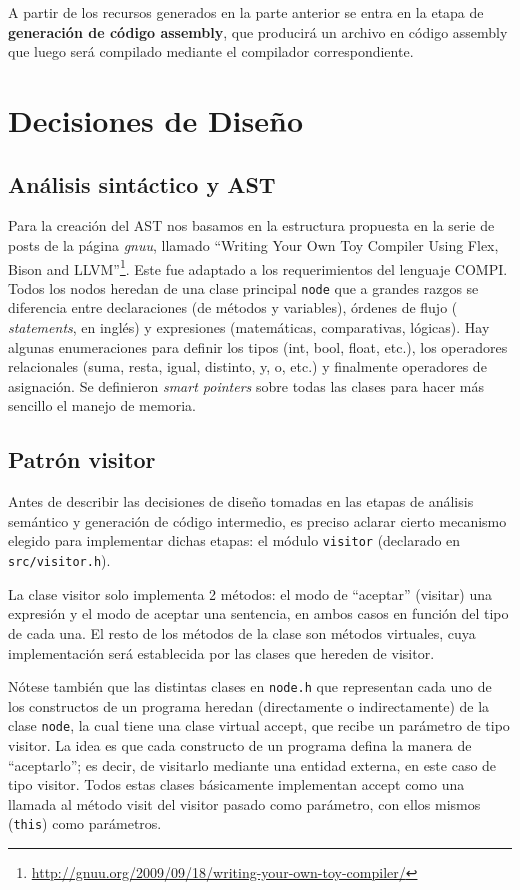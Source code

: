 \documentclass[12pt, a4paper, titlepage]{article}
\begin{document}
  A partir de los recursos generados en la parte anterior se entra en la etapa
  de {\bf generación de código assembly}, que producirá un archivo en código
  assembly que luego será compilado mediante el compilador correspondiente.

  \section{Decisiones de Diseño}\label{sec:design}

  \subsection{Análisis sintáctico y AST}

  Para la creación del AST nos basamos en la estructura propuesta en la serie de
  posts de la página {\em gnuu}, llamado ``Writing Your Own Toy Compiler Using
  Flex, Bison and
  LLVM''\footnote{\url{http://gnuu.org/2009/09/18/writing-your-own-toy-compiler/}}.
  Este fue adaptado a los requerimientos del lenguaje COMPI. Todos los nodos
  heredan de una clase principal {\tt node} que a grandes razgos se diferencia
  entre declaraciones (de métodos y variables), órdenes de flujo ({\em
  statements}, en inglés) y expresiones (matemáticas, comparativas, lógicas).
  Hay algunas enumeraciones para definir los tipos (int, bool, float, etc.), los
  operadores relacionales (suma, resta, igual, distinto, y, o, etc.) y
  finalmente operadores de asignación. Se definieron {\em smart pointers} sobre
  todas las clases para hacer más sencillo el manejo de memoria.

  \subsection{Patrón visitor}

  Antes de describir las decisiones de diseño tomadas en las etapas de  análisis
  semántico y generación de código intermedio, es preciso aclarar cierto
  mecanismo elegido para implementar dichas etapas: el módulo {\tt visitor} (declarado
  en {\tt src/visitor.h}).

	La clase visitor solo implementa 2 métodos: el modo de ``aceptar'' (visitar)
	una expresión y el modo de aceptar una sentencia, en ambos casos en función
	del tipo de cada una. El resto de los métodos de la clase son métodos
	virtuales, cuya implementación será establecida por las clases que hereden de
	visitor.

	Nótese también que las distintas clases en {\tt node.h} que representan cada
	uno de los constructos de un programa heredan (directamente o indirectamente)
	de la clase {\tt node}, la cual tiene una clase virtual accept, que recibe un
	parámetro de tipo visitor. La idea es que cada constructo de un programa
	defina la manera de ``aceptarlo''; es decir, de visitarlo mediante una entidad
	externa, en este caso de tipo visitor. Todos estas clases básicamente
	implementan accept como una llamada al método visit del visitor pasado como
	parámetro, con ellos mismos ({\tt *this}) como parámetros.
\end{document}
